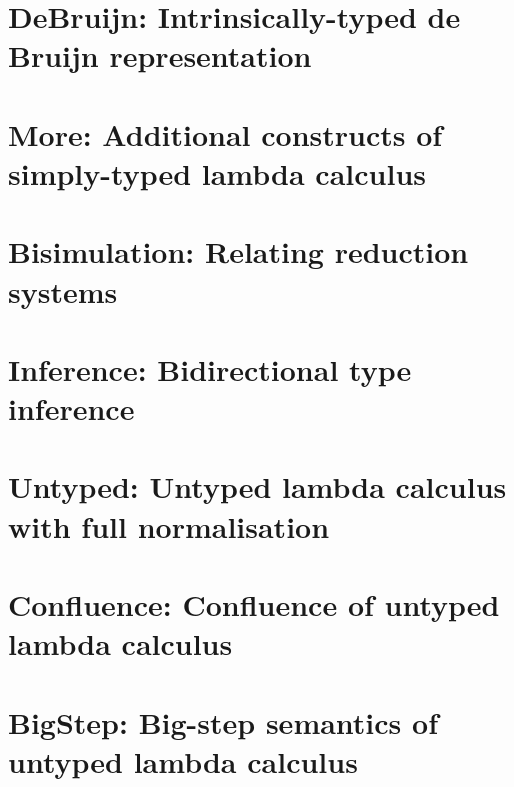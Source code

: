 \documentclass[10pt]{book}
\begin{document}
\hypertarget{debruijn}{%
  \chapter{DeBruijn: Intrinsically-typed de Bruijn representation}\label{debruijn}}


\hypertarget{more}{%
  \chapter{More: Additional constructs of simply-typed lambda calculus}\label{more}}


\hypertarget{bisimulation}{%
  \chapter{Bisimulation: Relating reduction systems}\label{bisimulation}}


\hypertarget{inference}{%
  \chapter{Inference: Bidirectional type inference}\label{inference}}


\hypertarget{untyped}{%
  \chapter{Untyped: Untyped lambda calculus with full normalisation}\label{untyped}}


\hypertarget{confluence}{%
  \chapter{Confluence: Confluence of untyped lambda calculus}\label{confluence}}


\hypertarget{bigstep}{%
  \chapter{BigStep: Big-step semantics of untyped lambda calculus}\label{bigstep}}








\end{document}
